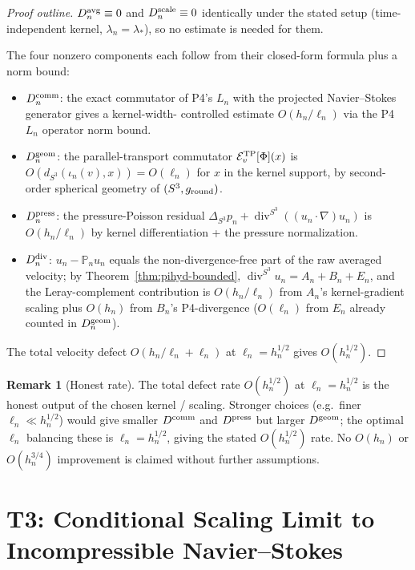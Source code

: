 \documentclass[11pt, a4paper]{amsart}
\theoremstyle{definition}
\newtheorem{remark}[theorem]{Remark}
\newcommand{\dsph}{d_{S^3}}
\newcommand{\divS}{\operatorname{div}^{S^3}}
\newcommand{\LapS}{\Delta_{S^3}}
\newcommand{\Projn}{\mathbb P_n}
\begin{document}
\begin{proof}[Proof outline]
$D_n^{\rm avg} \equiv 0$ and $D_n^{\rm scale} \equiv 0$
identically under the stated setup (time-independent kernel,
$\lambda_n = \lambda_\ast$), so no estimate is needed for them.

The four nonzero components each follow from their closed-form
formula plus a norm bound:
\begin{itemize}
\item $D_n^{\rm comm}$: the exact commutator of P4's $L_n$ with
  the projected Navier--Stokes generator gives a kernel-width-
  controlled estimate $O(h_n/\ell_n)$ via the P4 $L_n$ operator
  norm bound.
\item $D_n^{\rm geom}$: the parallel-transport commutator
  $\mathcal E^{\rm TP}_v[\Phi](x)$ is $O(\dsph(\iota_n(v), x))
  = O(\ell_n)$ for $x$ in the kernel support, by second-order
  spherical geometry of $(S^3, g_{\rm round})$.
\item $D_n^{\rm press}$: the pressure-Poisson residual
  $\LapS p_n + \divS((u_n\cdot\nabla)u_n)$ is $O(h_n/\ell_n)$
  by kernel differentiation + the pressure normalization.
\item $D_n^{\rm div}$: $u_n - \Projn u_n$ equals the
  non-divergence-free part of the raw averaged velocity; by
  Theorem~\ref{thm:pihyd-bounded}, $\divS u_n = A_n + B_n + E_n$,
  and the Leray-complement contribution is $O(h_n/\ell_n)$ from
  $A_n$'s kernel-gradient scaling plus $O(h_n)$ from $B_n$'s
  P4-divergence ($O(\ell_n)$ from $E_n$ already counted in
  $D_n^{\rm geom}$).
\end{itemize}
The total velocity defect $O(h_n/\ell_n + \ell_n)$ at $\ell_n =
h_n^{1/2}$ gives $O(h_n^{1/2})$.
\end{proof}

\begin{remark}[Honest rate]
\label{rmk:defect-rate}
The total defect rate $O(h_n^{1/2})$ at $\ell_n = h_n^{1/2}$ is
the honest output of the chosen kernel / scaling. Stronger
choices (e.g.\ finer $\ell_n \ll h_n^{1/2}$) would give smaller
$D^{\rm comm}$ and $D^{\rm press}$ but larger $D^{\rm geom}$; the
optimal $\ell_n$ balancing these is $\ell_n = h_n^{1/2}$, giving
the stated $O(h_n^{1/2})$ rate. No $O(h_n)$ or $O(h_n^{3/4})$
improvement is claimed without further assumptions.
\end{remark}

\section{T3: Conditional Scaling Limit to Incompressible Navier--Stokes}
\label{sec:scaling-limit}
\end{document}
